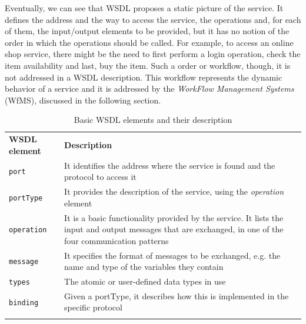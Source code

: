 Eventually, we can see that WSDL proposes a static picture of the service. It defines the address and the way to access the service, the operations and, for each of them, the input/output elements to be provided, but it has no notion of the order in which the operations should be called. For example, to access an online shop service, there might be the need to first perform a login operation, check the item availability and last, buy the item. Such a order or workflow, though, it is not addressed in a WSDL description. This workflow represents the dynamic behavior of a service and it is addressed by the \textit{WorkFlow Management Systems} (WfMS), discussed in the following section.


% 
\begin{table}
\begin{center}
\begin{tabular}{l p{12cm}}

						\toprule
						\addlinespace[0.2cm]
\textbf{WSDL element} 	& \textbf{Description}	\\ 
						\cmidrule(l){1-2}
\verb|port| 		& It identifies the address where the service is found and the protocol to access it 				\\[0,1cm]
\verb|portType| 	& It provides the description of the service, using the \textit{operation} element 				\\[0,1cm]
\verb|operation| 	& It is a basic functionality provided by the service. It lists the input and output messages that are exchanged, in one of the four communication patterns 														\\[0,1cm]
\verb|message| 		& It specifies the format of messages to be exchanged, e.g. the name and type of the variables they contain 	\\[0,1cm]
\verb|types|		& The atomic or user-defined data types in use  								\\[0,1cm]
\verb|binding|		& Given a portType, it describes how this is implemented in the specific protocol 				\\[0,1cm]
	 
						\addlinespace[0.2cm]
						\bottomrule
\end{tabular}
\end{center}
\caption{Basic WSDL elements and their description}
\label{tab:WSDLElements}
\end{table}

